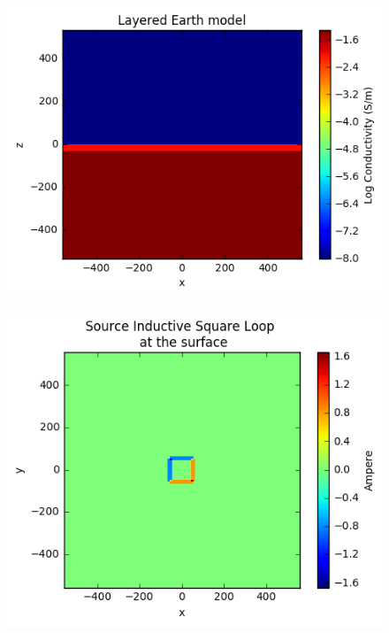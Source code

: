 \documentclass[twoside]{article}
\begin{document}
\begin{figure}[H]
\centering
\begin{minipage}{0.5\textwidth}
  \centering
  \includegraphics[width=\linewidth]{./figures/Examples/layerearthmodel.png}
  \label{Layer_model}
\end{minipage}%
\begin{minipage}{.5\textwidth}
  \centering
  \includegraphics[width=\linewidth]{./figures/Examples/Source.png}
  \label{Square_loop}
\end{minipage}
\end{figure}
\end{document}

